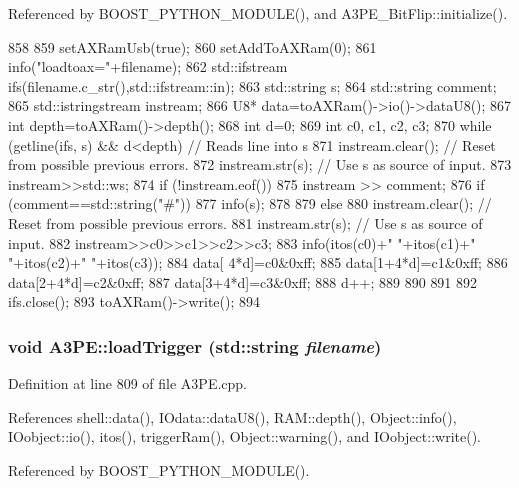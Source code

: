 Referenced by BOOST\_\-PYTHON\_\-MODULE(), and A3PE\_\-BitFlip::initialize().


\begin{DoxyCode}
858                                      {
859   setAXRamUsb(true);
860   setAddToAXRam(0);
861   info("loadtoax="+filename);
862   std::ifstream ifs(filename.c_str(),std::ifstream::in);
863   std::string s;
864   std::string comment;
865   std::istringstream instream;
866   U8* data=toAXRam()->io()->dataU8();
867   int depth=toAXRam()->depth();
868   int d=0;
869   int c0, c1, c2, c3;
870   while (getline(ifs, s) && d<depth) { // Reads line into s
871       instream.clear();     // Reset from possible previous errors.
872       instream.str(s);      // Use s as source of input.
873       instream>>std::ws;
874       if (!instream.eof()) {
875         instream >> comment;
876         if (comment==std::string("#")) {
877           info(s);
878         }
879         else {
880           instream.clear();     // Reset from possible previous errors.
881           instream.str(s);      // Use s as source of input.
882           instream>>c0>>c1>>c2>>c3;
883           info(itos(c0)+" "+itos(c1)+" "+itos(c2)+" "+itos(c3));
884           data[  4*d]=c0&0xff;
885           data[1+4*d]=c1&0xff;
886           data[2+4*d]=c2&0xff;
887           data[3+4*d]=c3&0xff;
888           d++;
889         }
890       }
891   }
892   ifs.close();
893   toAXRam()->write();
894 }
\end{DoxyCode}
\hypertarget{classA3PE_a34a9499a0d9065a1b5772880d7e8d5c4}{
\subsubsection[{loadTrigger}]{\setlength{\rightskip}{0pt plus 5cm}void A3PE::loadTrigger (std::string {\em filename})}}
\label{classA3PE_a34a9499a0d9065a1b5772880d7e8d5c4}


Definition at line 809 of file A3PE.cpp.

References shell::data(), IOdata::dataU8(), RAM::depth(), Object::info(), IOobject::io(), itos(), triggerRam(), Object::warning(), and IOobject::write().

Referenced by BOOST\_\-PYTHON\_\-MODULE().


